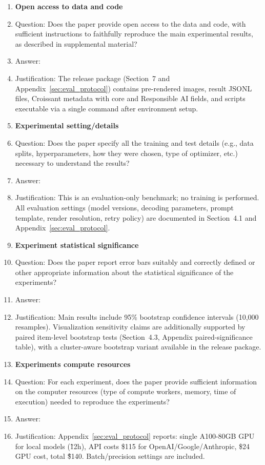 \documentclass{article}
\begin{document}
\begin{enumerate}
\item {\bf Open access to data and code}
    \item[] Question: Does the paper provide open access to the data and code, with sufficient instructions to faithfully reproduce the main experimental results, as described in supplemental material?
    \item[] Answer: \answerYes{}
    \item[] Justification: The release package (Section~7 and Appendix~\ref{sec:eval_protocol}) contains pre-rendered images, result JSONL files, Croissant metadata with core and Responsible AI fields, and scripts executable via a single command after environment setup.

\item {\bf Experimental setting/details}
    \item[] Question: Does the paper specify all the training and test details (e.g., data splits, hyperparameters, how they were chosen, type of optimizer, etc.) necessary to understand the results?
    \item[] Answer: \answerYes{}
    \item[] Justification: This is an evaluation-only benchmark; no training is performed. All evaluation settings (model versions, decoding parameters, prompt template, render resolution, retry policy) are documented in Section~4.1 and Appendix~\ref{sec:eval_protocol}.

\item {\bf Experiment statistical significance}
    \item[] Question: Does the paper report error bars suitably and correctly defined or other appropriate information about the statistical significance of the experiments?
    \item[] Answer: \answerYes{}
    \item[] Justification: Main results include 95\% bootstrap confidence intervals (10,000 resamples). Visualization sensitivity claims are additionally supported by paired item-level bootstrap tests (Section~4.3, Appendix paired-significance table), with a cluster-aware bootstrap variant available in the release package.

\item {\bf Experiments compute resources}
    \item[] Question: For each experiment, does the paper provide sufficient information on the computer resources (type of compute workers, memory, time of execution) needed to reproduce the experiments?
    \item[] Answer: \answerYes{}
    \item[] Justification: Appendix~\ref{sec:eval_protocol} reports: single A100-80GB GPU for local models (\~12h), API costs \$115 for OpenAI/Google/Anthropic, \$24 GPU cost, total \~\$140. Batch/precision settings are included.


\end{enumerate}
\end{document}
